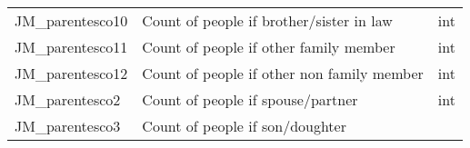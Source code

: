\documentclass[11pt]{article}
\begin{document}
\begin{longtable}[]{@{}lll@{}}
\begin{minipage}[t]{0.63\columnwidth}\raggedright\strut
JM\_parentesco10\strut
\end{minipage} & \begin{minipage}[t]{0.12\columnwidth}\raggedright\strut
Count of people if brother/sister in law\strut
\end{minipage} & \begin{minipage}[t]{0.16\columnwidth}\raggedright\strut
int\strut
\end{minipage}\tabularnewline
\begin{minipage}[t]{0.63\columnwidth}\raggedright\strut
JM\_parentesco11\strut
\end{minipage} & \begin{minipage}[t]{0.12\columnwidth}\raggedright\strut
Count of people if other family member\strut
\end{minipage} & \begin{minipage}[t]{0.16\columnwidth}\raggedright\strut
int\strut
\end{minipage}\tabularnewline
\begin{minipage}[t]{0.63\columnwidth}\raggedright\strut
JM\_parentesco12\strut
\end{minipage} & \begin{minipage}[t]{0.12\columnwidth}\raggedright\strut
Count of people if other non family member\strut
\end{minipage} & \begin{minipage}[t]{0.16\columnwidth}\raggedright\strut
int\strut
\end{minipage}\tabularnewline
\begin{minipage}[t]{0.63\columnwidth}\raggedright\strut
JM\_parentesco2\strut
\end{minipage} & \begin{minipage}[t]{0.12\columnwidth}\raggedright\strut
Count of people if spouse/partner\strut
\end{minipage} & \begin{minipage}[t]{0.16\columnwidth}\raggedright\strut
int\strut
\end{minipage}\tabularnewline
\begin{minipage}[t]{0.63\columnwidth}\raggedright\strut
JM\_parentesco3\strut
\end{minipage} & \begin{minipage}[t]{0.12\columnwidth}\raggedright\strut
Count of people if son/doughter\strut
\end{minipage} & \begin{minipage}[t]{0.16\columnwidth}\raggedright\strut

\end{minipage}
\end{longtable}
\end{document}
